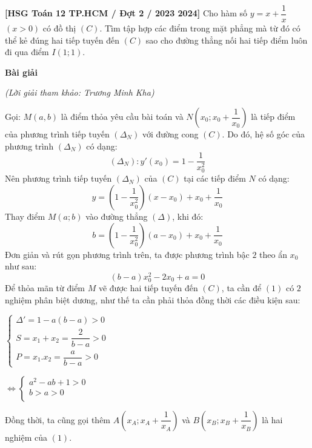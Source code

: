 \documentclass[12pt, a4paper]{article}
\begin{document}
	
\textbf{[HSG Toán 12 TP.HCM / Đợt 2 / 2023  2024]} Cho hàm số $y=x+\dfrac{1}{x}$ $(x>0)$ có đồ thị $(C)$. Tìm tập hợp các điểm trong mặt phẳng mà từ đó có thể kẻ đúng hai tiếp tuyến đến $(C)$ sao cho đường thẳng nối hai tiếp điểm luôn đi qua điểm $I(1;1)$.
\begin{center}
\textbf{Bài giải} 

\textit{(Lời giải tham khảo: Trương Minh Kha)}
\end{center}
Gọi: $ M(a, b)$ là điểm thỏa yêu cầu bài toán và $ N\left(x_0; x_0 + \dfrac{1}{x_0}\right) $ là tiếp điểm của phương trình tiếp tuyến $ \left( \Delta_N \right) $ với đường cong $ (C) $.
Do đó, hệ số góc của phương trình $(\Delta_N)$ có dạng:   $$ (\Delta_N):  y'(x_0) = 1 - \dfrac{1}{x_0^2} $$
Nên phương trình tiếp tuyến $ (\Delta_N) $ của $ (C) $ tại các tiếp điểm $ N $ có dạng: $$ y = \left(1 - \dfrac{1}{x_0^2} \right) (x - x_0) + x_0 + \dfrac{1}{x_0} $$
Thay điểm $ M(a;b) $ vào đường thẳng $ (\Delta) $, khi đó: $$ b = \left(1 - \dfrac{1}{x_0^2} \right)(a - x_0) + x_0 + \dfrac{1}{x_0}$$
Đơn giản và rút gọn phương trình trên, ta được phương trình bậc $ 2 $ theo ẩn $ x_0 $ như sau:
\begin{equation}\label{E:1}
 (b - a)x_0^2 -2x_0 + a = 0 
\end{equation}
Để thỏa mãn từ điểm $ M $ vẽ được hai tiếp tuyến đến $ (C) $, ta cần để $(1)$ có $ 2 $ nghiệm phân biệt dương, như thế ta cần phải thỏa đồng thời các điều kiện sau:

\begin{minipage}{0.5\textwidth}  
\begin{flushright}
	$
	\begin{cases}
	    \Delta' = 1 - a(b - a) > 0 \\
	    S = x_1 + x_2 = \dfrac{2}{b - a} > 0  \\
	    P = x_1 . x_2 = \dfrac{a}{b - a} > 0
	\end{cases}
	$
\end{flushright}
\end{minipage}
\begin{minipage}{0.5\textwidth}
	$
	\iff
	\begin{cases}
	    a^2 - ab + 1 > 0 \\
	    b > a > 0  \\
	\end{cases}
	$
\end{minipage}

Đồng thời, ta cũng gọi thêm $A \left( x_A; x_A + \dfrac{1}{x_A} \right) $ và $ B \left( x_B; x_B + \dfrac{1}{x_B} \right) $ là hai nghiệm của $ (1) $.
\end{document}
